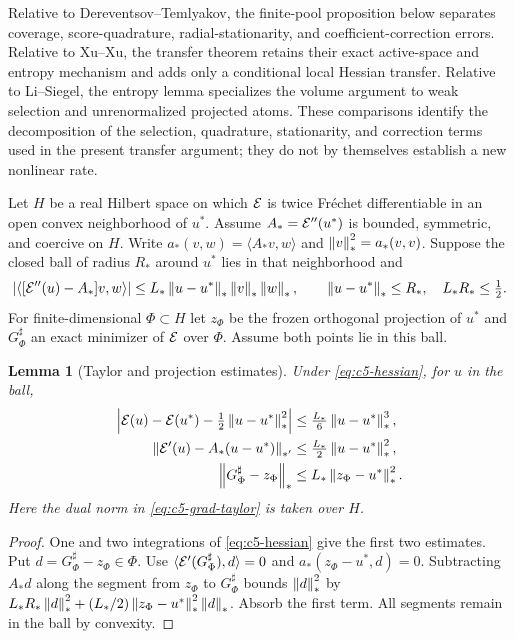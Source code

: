 \documentclass[11pt]{article}
\newtheorem{lemma}[theorem]{Lemma}
\theoremstyle{remark}
\begin{document}
Relative to Dereventsov--Temlyakov, the finite-pool proposition below
separates coverage, score-quadrature, radial-stationarity, and
coefficient-correction errors. Relative to Xu--Xu, the transfer theorem
retains their exact active-space and entropy mechanism and adds only a
conditional local Hessian transfer. Relative to Li--Siegel, the entropy
lemma specializes the volume argument to weak selection and unrenormalized
projected atoms. These comparisons identify the decomposition of the selection,
quadrature, stationarity, and correction terms used in the present transfer argument;
they do not by themselves establish a new nonlinear rate.

Let $H$ be a real Hilbert space on which $\mathcal E$ is twice Fr\'echet
differentiable in an open convex neighborhood of $u^*$.
Assume $A_*=\mathcal E''(u^*)$ is bounded, symmetric, and coercive on $H$.
Write $a_*(v,w)=\langle A_*v,w\rangle$ and $\left\lVert v\right\rVert_*^2=a_*(v,v)$.
Suppose the closed ball of radius $R_*$ around $u^*$ lies in that
neighborhood and
\begin{equation}
 |\langle[\mathcal E''(u)-A_*]v,w\rangle|
 \leq L_*\left\lVert u-u^*\right\rVert_*\left\lVert v\right\rVert_*\left\lVert w\right\rVert_*,
 \qquad \left\lVert u-u^*\right\rVert_*\leq R_*,\quad L_*R_*\leq\tfrac12 .
 \label{eq:c5-hessian}
\end{equation}
For finite-dimensional $\Phi\subset H$ let $z_\Phi$ be the frozen
orthogonal projection of $u^*$ and $G_\Phi^\sharp$ an exact minimizer
of $\mathcal E$ over $\Phi$. Assume both points lie in this ball.

\begin{lemma}[Taylor and projection estimates]
\label{lem:c5-projection}
Under \eqref{eq:c5-hessian}, for $u$ in the ball,
\begin{align}
 \left|\mathcal E(u)-\mathcal E(u^*)-\tfrac12\left\lVert u-u^*\right\rVert_*^2\right|
 &\leq\tfrac{L_*}{6}\left\lVert u-u^*\right\rVert_*^3,\label{eq:c5-taylor}\\
 \left\lVert\mathcal E'(u)-A_*(u-u^*)\right\rVert_{*'}
 &\leq\tfrac{L_*}{2}\left\lVert u-u^*\right\rVert_*^2,\label{eq:c5-grad-taylor}\\
 \left\lVert G_\Phi^\sharp-z_\Phi\right\rVert_*
 &\leq L_*\left\lVert z_\Phi-u^*\right\rVert_*^2.\label{eq:c5-proj}
\end{align}
Here the dual norm in \eqref{eq:c5-grad-taylor} is taken over $H$.
\end{lemma}
\begin{proof}
One and two integrations of \eqref{eq:c5-hessian} give the first
two estimates. Put $d=G_\Phi^\sharp-z_\Phi\in\Phi$.
Use $\langle\mathcal E'(G_\Phi^\sharp),d\rangle=0$ and
$a_*(z_\Phi-u^*,d)=0$. Subtracting $A_*d$ along the segment from
$z_\Phi$ to $G_\Phi^\sharp$ bounds
$\left\lVert d\right\rVert_*^2$ by
$L_*R_*\left\lVert d\right\rVert_*^2+(L_*/2)\left\lVert z_\Phi-u^*\right\rVert_*^2\left\lVert d\right\rVert_*$.
Absorb the first term. All segments remain in the ball by convexity.
\end{proof}
\end{document}
